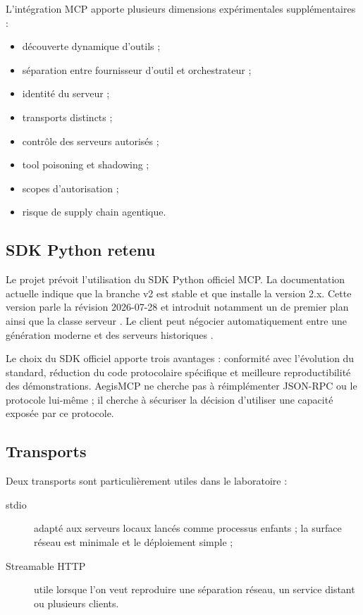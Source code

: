 L'intégration MCP apporte plusieurs dimensions expérimentales supplémentaires :

\begin{itemize}
    \item découverte dynamique d'outils ;
    \item séparation entre fournisseur d'outil et orchestrateur ;
    \item identité du serveur ;
    \item transports distincts ;
    \item contrôle des serveurs autorisés ;
    \item tool poisoning et shadowing ;
    \item scopes d'autorisation ;
    \item risque de supply chain agentique.
\end{itemize}

\subsection{SDK Python retenu}

Le projet prévoit l'utilisation du SDK Python officiel MCP. La documentation actuelle indique que la branche v2 est stable et que  installe la version 2.x. Cette version parle la révision 2026-07-28 et introduit notamment un  de premier plan ainsi que la classe serveur  \cite{mcppythonv2}. Le client peut négocier automatiquement entre une génération moderne et des serveurs historiques \cite{mcpprotocolversions}.

Le choix du SDK officiel apporte trois avantages : conformité avec l'évolution du standard, réduction du code protocolaire spécifique et meilleure reproductibilité des démonstrations. AegisMCP ne cherche pas à réimplémenter JSON-RPC ou le protocole lui-même ; il cherche à sécuriser la décision d'utiliser une capacité exposée par ce protocole.

\subsection{Transports}

Deux transports sont particulièrement utiles dans le laboratoire :

\begin{description}
    \item[stdio] adapté aux serveurs locaux lancés comme processus enfants ; la surface réseau est minimale et le déploiement simple ;
    \item[Streamable HTTP] utile lorsque l'on veut reproduire une séparation réseau, un service distant ou plusieurs clients.
\end{description}

